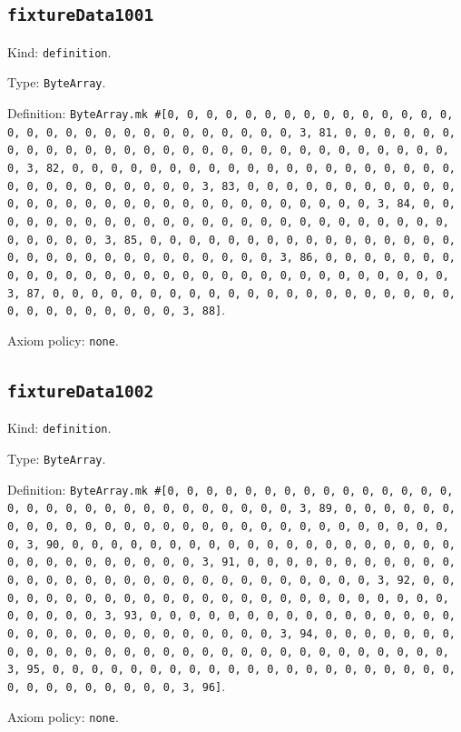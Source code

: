 \documentclass[11pt]{article}
\begin{document}
\subsection*{\texttt{fixtureData1001}}
\noindent Kind: \texttt{definition}.\par
\noindent Type: \texttt{ByteArray}.\par
\noindent Definition: \texttt{ByteArray.mk \#[0, 0, 0, 0, 0, 0, 0, 0, 0, 0, 0, 0, 0, 0, 0, 0, 0, 0, 0, 0, 0, 0, 0, 0, 0, 0, 0, 0, 0, 0, 3, 81, 0, 0, 0, 0, 0, 0, 0, 0, 0, 0, 0, 0, 0, 0, 0, 0, 0, 0, 0, 0, 0, 0, 0, 0, 0, 0, 0, 0, 0, 0, 3, 82, 0, 0, 0, 0, 0, 0, 0, 0, 0, 0, 0, 0, 0, 0, 0, 0, 0, 0, 0, 0, 0, 0, 0, 0, 0, 0, 0, 0, 0, 0, 3, 83, 0, 0, 0, 0, 0, 0, 0, 0, 0, 0, 0, 0, 0, 0, 0, 0, 0, 0, 0, 0, 0, 0, 0, 0, 0, 0, 0, 0, 0, 0, 3, 84, 0, 0, 0, 0, 0, 0, 0, 0, 0, 0, 0, 0, 0, 0, 0, 0, 0, 0, 0, 0, 0, 0, 0, 0, 0, 0, 0, 0, 0, 0, 3, 85, 0, 0, 0, 0, 0, 0, 0, 0, 0, 0, 0, 0, 0, 0, 0, 0, 0, 0, 0, 0, 0, 0, 0, 0, 0, 0, 0, 0, 0, 0, 3, 86, 0, 0, 0, 0, 0, 0, 0, 0, 0, 0, 0, 0, 0, 0, 0, 0, 0, 0, 0, 0, 0, 0, 0, 0, 0, 0, 0, 0, 0, 0, 3, 87, 0, 0, 0, 0, 0, 0, 0, 0, 0, 0, 0, 0, 0, 0, 0, 0, 0, 0, 0, 0, 0, 0, 0, 0, 0, 0, 0, 0, 0, 0, 3, 88]}.\par
\noindent Axiom policy: \texttt{none}.\par
\subsection*{\texttt{fixtureData1002}}
\noindent Kind: \texttt{definition}.\par
\noindent Type: \texttt{ByteArray}.\par
\noindent Definition: \texttt{ByteArray.mk \#[0, 0, 0, 0, 0, 0, 0, 0, 0, 0, 0, 0, 0, 0, 0, 0, 0, 0, 0, 0, 0, 0, 0, 0, 0, 0, 0, 0, 0, 0, 3, 89, 0, 0, 0, 0, 0, 0, 0, 0, 0, 0, 0, 0, 0, 0, 0, 0, 0, 0, 0, 0, 0, 0, 0, 0, 0, 0, 0, 0, 0, 0, 3, 90, 0, 0, 0, 0, 0, 0, 0, 0, 0, 0, 0, 0, 0, 0, 0, 0, 0, 0, 0, 0, 0, 0, 0, 0, 0, 0, 0, 0, 0, 0, 3, 91, 0, 0, 0, 0, 0, 0, 0, 0, 0, 0, 0, 0, 0, 0, 0, 0, 0, 0, 0, 0, 0, 0, 0, 0, 0, 0, 0, 0, 0, 0, 3, 92, 0, 0, 0, 0, 0, 0, 0, 0, 0, 0, 0, 0, 0, 0, 0, 0, 0, 0, 0, 0, 0, 0, 0, 0, 0, 0, 0, 0, 0, 0, 3, 93, 0, 0, 0, 0, 0, 0, 0, 0, 0, 0, 0, 0, 0, 0, 0, 0, 0, 0, 0, 0, 0, 0, 0, 0, 0, 0, 0, 0, 0, 0, 3, 94, 0, 0, 0, 0, 0, 0, 0, 0, 0, 0, 0, 0, 0, 0, 0, 0, 0, 0, 0, 0, 0, 0, 0, 0, 0, 0, 0, 0, 0, 0, 3, 95, 0, 0, 0, 0, 0, 0, 0, 0, 0, 0, 0, 0, 0, 0, 0, 0, 0, 0, 0, 0, 0, 0, 0, 0, 0, 0, 0, 0, 0, 0, 3, 96]}.\par
\noindent Axiom policy: \texttt{none}.\par
\end{document}
